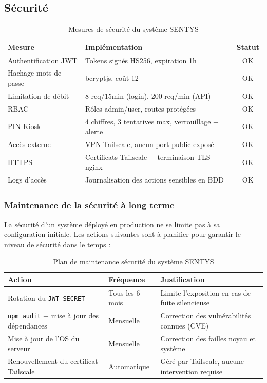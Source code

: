 \documentclass[12pt,a4paper]{article}
\begin{document}
\subsection{Sécurité}

\begin{table}[H]
\centering
\small
\begin{tabular}{|l|p{7cm}|c|}
\hline
\textbf{Mesure} & \textbf{Implémentation} & \textbf{Statut} \\
\hline
Authentification JWT & Tokens signés HS256, expiration 1h & OK \\
\hline
Hachage mots de passe & bcryptjs, coût 12 & OK \\
\hline
Limitation de débit & 8 req/15min (login), 200 req/min (API) & OK \\
\hline
RBAC & Rôles admin/user, routes protégées & OK \\
\hline
PIN Kiosk & 4 chiffres, 3 tentatives max, verrouillage + alerte & OK \\
\hline
Accès externe & VPN Tailscale, aucun port public exposé & OK \\
\hline
HTTPS & Certificats Tailscale + terminaison TLS nginx & OK \\
\hline
Logs d'accès & Journalisation des actions sensibles en BDD & OK \\
\hline
\end{tabular}
\caption{Mesures de sécurité du système SENTYS}
\end{table}

\subsubsection{Maintenance de la sécurité à long terme}

La sécurité d'un système déployé en production ne se limite pas à sa configuration initiale. Les actions suivantes sont à planifier pour garantir le niveau de sécurité dans le temps :

\begin{table}[H]
\centering
\small
\renewcommand{\arraystretch}{1.3}
\begin{tabular}{|l|p{4.5cm}|p{4.5cm}|}
\hline
\textbf{Action} & \textbf{Fréquence} & \textbf{Justification} \\
\hline
Rotation du \texttt{JWT\_SECRET} & Tous les 6 mois & Limite l'exposition en cas de fuite silencieuse \\
\hline
\texttt{npm audit} + mise à jour des dépendances & Mensuelle & Correction des vulnérabilités connues (CVE) \\
\hline
Mise à jour de l'OS du serveur & Mensuelle & Correction des failles noyau et système \\
\hline
Renouvellement du certificat Tailscale & Automatique & Géré par Tailscale, aucune intervention requise \\
\hline
\end{tabular}
\caption{Plan de maintenance sécurité du système SENTYS}
\end{table}
\end{document}
